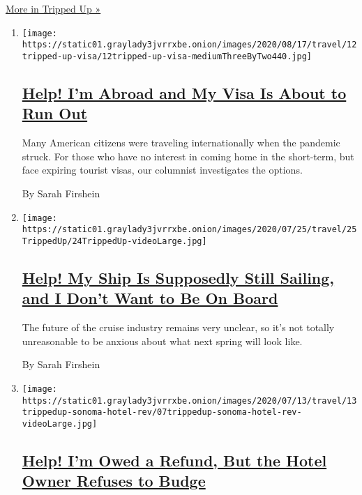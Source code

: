 \href{/column/tripped-up}{More in Tripped Up »}

\begin{enumerate}
\def\labelenumi{\arabic{enumi}.}
\item
  \texttt{[image: https://static01.graylady3jvrrxbe.onion/images/2020/08/17/travel/12tripped-up-visa/12tripped-up-visa-mediumThreeByTwo440.jpg]}

  \hypertarget{help-im-abroad-and-my-visa-is-about-to-run-out}{%
  \subsection{\texorpdfstring{\href{/2020/08/12/travel/virus-visa-extensions.html}{Help!
  I'm Abroad and My Visa Is About to Run
  Out}}{Help! I'm Abroad and My Visa Is About to Run Out}}\label{help-im-abroad-and-my-visa-is-about-to-run-out}}

  Many American citizens were traveling internationally when the
  pandemic struck. For those who have no interest in coming home in the
  short-term, but face expiring tourist visas, our columnist
  investigates the options.

  By Sarah Firshein
\item
  \texttt{[image: https://static01.graylady3jvrrxbe.onion/images/2020/07/25/travel/25TrippedUp/24TrippedUp-videoLarge.jpg]}

  \hypertarget{help-my-ship-is-supposedly-still-sailing-and-i-dont-want-to-be-on-board}{%
  \subsection{\texorpdfstring{\href{/2020/07/22/travel/virus-cruise-refunds.html}{Help!
  My Ship Is Supposedly Still Sailing, and I Don't Want to Be On
  Board}}{Help! My Ship Is Supposedly Still Sailing, and I Don't Want to Be On Board}}\label{help-my-ship-is-supposedly-still-sailing-and-i-dont-want-to-be-on-board}}

  The future of the cruise industry remains very unclear, so it's not
  totally unreasonable to be anxious about what next spring will look
  like.

  By Sarah Firshein
\item
  \texttt{[image: https://static01.graylady3jvrrxbe.onion/images/2020/07/13/travel/13trippedup-sonoma-hotel-rev/07trippedup-sonoma-hotel-rev-videoLarge.jpg]}

  \hypertarget{help-im-owed-a-refund-but-the-hotel-owner-refuses-to-budge}{%
  \subsection{\texorpdfstring{\href{/2020/07/07/travel/virus-refunds-hotel-franchises.html}{Help!
  I'm Owed a Refund, But the Hotel Owner Refuses to
  Budge}}{Help! I'm Owed a Refund, But the Hotel Owner Refuses to Budge}}\label{help-im-owed-a-refund-but-the-hotel-owner-refuses-to-budge}}


\end{enumerate}
